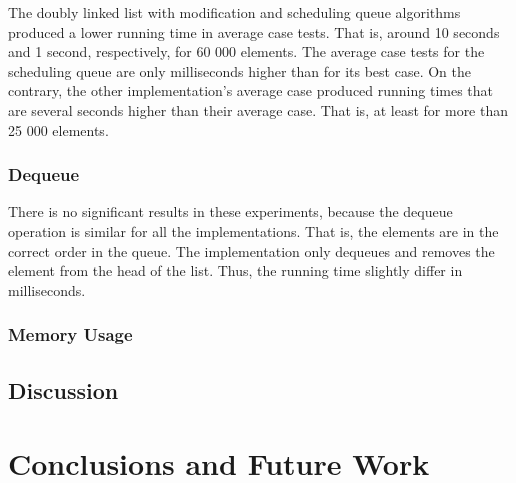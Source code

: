 \documentclass[a4paper,11pt]{kth-mag}
\newcommand*{\skippara}{\par\vspace{\baselineskip} \noindent}
\begin{document}
\skippara The doubly linked list with modification and scheduling queue algorithms produced a lower running time in average case tests.
That is, around 10 seconds and 1 second, respectively, for 60 000 elements.
The average case tests for the scheduling queue are only milliseconds higher than for its best case.
On the contrary, the other implementation's average case produced running times that are several seconds higher than their average case.
That is, at least for more than 25 000 elements.



\subsection{Dequeue}

There is no significant results in these experiments, because the dequeue operation is similar for all the implementations.
That is, the elements are in the correct order in the queue.
The implementation only dequeues and removes the element from the head of the list.
Thus, the running time slightly differ in milliseconds.

\subsection{Memory Usage}


\section{Discussion}


\chapter{Conclusions and Future Work}

%
\appendix
\addappheadtotoc
\end{document}
